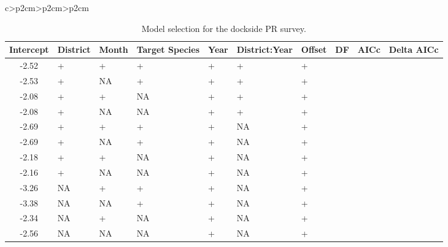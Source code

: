 \documentclass[11pt,
  letterpaper,
]{article}
\begin{document}
\begin{longtable}[t]{c>{\centering\arraybackslash}p{2cm}>{\centering\arraybackslash}p{2cm}>{\centering\arraybackslash}p{2cm}}
\begin{table}[H]
\centering\centering\centering
\caption{\label{tab:pr-modelselect}Model selection for the dockside PR survey.}
\centering
\fontsize{8}{10}\selectfont
\fontsize{8}{10}\selectfont
\begin{tabular}[t]{c>{\centering\arraybackslash}p{0.8cm}>{\centering\arraybackslash}p{0.8cm}>{\centering\arraybackslash}p{0.8cm}>{\centering\arraybackslash}p{0.8cm}>{\centering\arraybackslash}p{0.8cm}>{\centering\arraybackslash}p{0.8cm}>{\centering\arraybackslash}p{0.8cm}>{\centering\arraybackslash}p{0.8cm}>{\centering\arraybackslash}p{0.8cm}}
\toprule
Intercept & District & Month & Target Species & Year & District:Year & Offset & DF & AICc & Delta AICc\\
\midrule
-2.52 & + & + & + & + & + & + & 75 & 123549.8 & 0.00\\
-2.53 & + & NA & + & + & + & + & 67 & 123623.0 & 73.20\\
-2.08 & + & + & NA & + & + & + & 73 & 123952.7 & 402.93\\
-2.08 & + & NA & NA & + & + & + & 65 & 124040.3 & 490.48\\
-2.69 & + & + & + & + & NA & + & 30 & 124728.0 & 1178.18\\
-2.69 & + & NA & + & + & NA & + & 22 & 124796.3 & 1246.54\\
-2.18 & + & + & NA & + & NA & + & 28 & 125169.0 & 1619.18\\
-2.16 & + & NA & NA & + & NA & + & 20 & 125250.9 & 1701.13\\
-3.26 & NA & + & + & + & NA & + & 27 & 125356.2 & 1806.36\\
-3.38 & NA & NA & + & + & NA & + & 19 & 125462.5 & 1912.71\\
-2.34 & NA & + & NA & + & NA & + & 25 & 127208.7 & 3658.87\\
-2.56 & NA & NA & NA & + & NA & + & 17 & 127440.6 & 3890.82\\
\bottomrule
\end{tabular}
\end{table}


\end{longtable}
\end{document}
